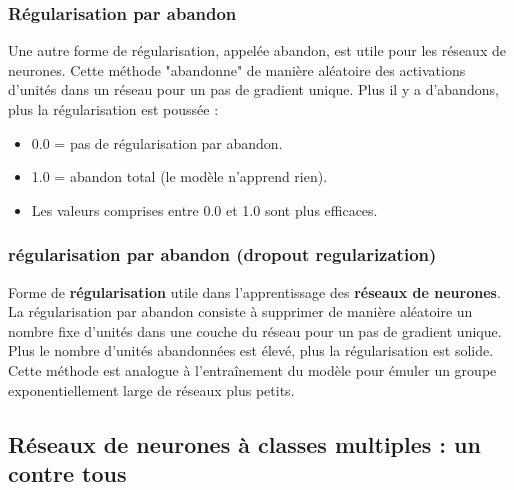 \documentclass[french]{article}
\begin{document}
\subsubsection{Régularisation par abandon}

Une autre forme de régularisation, appelée abandon, est utile pour les réseaux de neurones. Cette méthode "abandonne" de manière aléatoire des activations d'unités dans un réseau pour un pas de gradient unique. Plus il y a d'abandons, plus la régularisation est poussée :

\begin{itemize}[label=$\star$]
\item 0.0 = pas de régularisation par abandon.
\item 1.0 = abandon total (le modèle n'apprend rien).
\item Les valeurs comprises entre 0.0 et 1.0 sont plus efficaces.
\end{itemize}

\subsubsection{régularisation par abandon (dropout regularization)}
Forme de \textbf{régularisation} utile dans l'apprentissage des \textbf{réseaux de neurones}. La régularisation par abandon consiste à supprimer de manière aléatoire un nombre fixe d'unités dans une couche du réseau pour un pas de gradient unique. Plus le nombre d'unités abandonnées est élevé, plus la régularisation est solide. Cette méthode est analogue à l'entraînement du modèle pour émuler un groupe exponentiellement large de réseaux plus petits.

\subsection{Réseaux de neurones à classes multiples : un contre tous}
\end{document}
